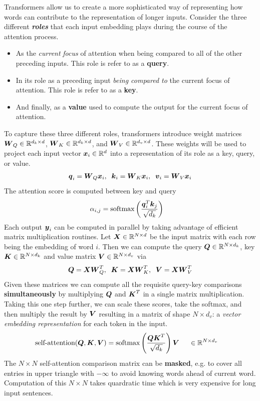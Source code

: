 \documentclass[11pt]{article}
\begin{document}
Transformers allow us to create a more sophisticated way of representing how words can contribute to the representation of longer inputs. Consider the three
different \emph{\textbf{roles}} that each input embedding plays during the course of the attention process.
\begin{itemize}
\item As the \emph{current} \emph{focus} of attention when being compared to all of the other preceding inputs. This role is refer to as a \textbf{query}.
\item In its role as a preceding input \emph{being compared to} the current focus of attention. This role is refer to as a \textbf{key}.
\item And finally, as a \textbf{value} used to compute the output for the current focus of attention.
\end{itemize} To capture these three different roles, transformers introduce weight matrices $\boldsymbol{W}_Q \in {\mathbb R}^{d_{k}\times d}$, $\boldsymbol{W}_K \in {\mathbb R}^{d_{k}\times d}$, and $\boldsymbol{W}_V \in {\mathbb R}^{d_{v}\times d}$. These weights will be used to project each input vector $\boldsymbol{x}_i \in {\mathbb R}^{d}$ into a representation of its role as a key, query, or value.
\begin{align*}
\boldsymbol{q}_{i} = \boldsymbol{W}_{Q}\boldsymbol{x}_{i},\;\;\boldsymbol{k}_{i} = \boldsymbol{W}_{K}\boldsymbol{x}_{i},\;\;\boldsymbol{v}_{i} = \boldsymbol{W}_{V}\boldsymbol{x}_{i}
\end{align*} The attention score is computed between key and query 
\begin{align}
\alpha_{i,j}&= \text{softmax}\left(\frac{\boldsymbol{q}_{i}^{T}\boldsymbol{k}_{j}}{\sqrt{d_{k}}}\right)  \label{eqn: attention_comp}
\end{align} Each output $\boldsymbol{y}_{i}$ can be computed in parallel by taking advantage of efficient matrix multiplication routines. Let $\boldsymbol{X} \in {\mathbb R}^{N \times d}$ be the input matrix with each row being the embedding of word $i$. Then we can compute the query $\boldsymbol{Q} \in {\mathbb R}^{N \times d_{k}}$, key $\boldsymbol{K} \in {\mathbb R}^{N \times d_{k}}$ and value matrix  $\boldsymbol{V} \in {\mathbb R}^{N \times d_{v}}$ via 
\begin{align*}
\boldsymbol{Q} = \boldsymbol{X}\boldsymbol{W}^{T}_{Q},\;\;\boldsymbol{K} = \boldsymbol{X}\boldsymbol{W}^{T}_{K},\;\;\boldsymbol{V} = \boldsymbol{X}\boldsymbol{W}^{T}_{V}
\end{align*} Given these matrices we can compute all the requisite query-key comparisons \textbf{simultaneously} by multiplying $\boldsymbol{Q}$ and $\boldsymbol{K}^{T}$ in a single matrix multiplication.  Taking this one step further, we can scale these scores, take the softmax, and then multiply the result by $\boldsymbol{V}$ resulting
in a matrix of shape $N \times d_{v}$: a \emph{vector embedding representation} for each token in the
input. 
\begin{align}
\text{self-attention}(\boldsymbol{Q}, \boldsymbol{K},  \boldsymbol{V}) &= \text{softmax}\left(\frac{\boldsymbol{Q}\boldsymbol{K}^{T}}{\sqrt{d_{k}}}\right)\boldsymbol{V}\;\;\;\;\; \in {\mathbb R}^{N\times d_{v}} \label{eqn: self_attention_mat}
\end{align} The $N\times N$ self-attention comparison matrix can be \textbf{masked}, e.g. to cover all entries in upper triangle with $-\infty$ to avoid knowing words ahead of current word. Computation of this $N\times N$ takes quardratic time which is very expensive for long input sentences. 
\end{document}
